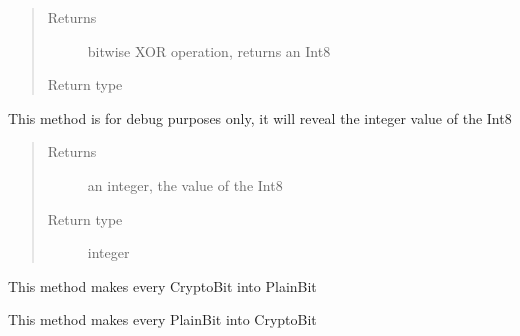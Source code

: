 \documentclass[letterpaper,10pt,english]{sphinxmanual}
\begin{document}
\begin{fulllineitems}
\begin{fulllineitems}
\begin{quote}
\begin{description}
\item[{Returns}] \leavevmode
bitwise XOR operation, returns an Int8

\item[{Return type}] \leavevmode
{\hyperref[datatypes.integers:datatypes.integers.Int8.Int8]{}}

\end{description}\end{quote}

\end{fulllineitems}


\begin{fulllineitems}
\label{datatypes.integers:datatypes.integers.Int8.Int8.debug_showValue}
This method is for debug purposes only, it will reveal the integer value of the Int8
\begin{quote}\begin{description}
\item[{Returns}] \leavevmode
an integer, the value of the Int8

\item[{Return type}] \leavevmode
integer

\end{description}\end{quote}

\end{fulllineitems}


\begin{fulllineitems}
\label{datatypes.integers:datatypes.integers.Int8.Int8.decrypt}
This method makes every CryptoBit into PlainBit

\end{fulllineitems}


\begin{fulllineitems}
\label{datatypes.integers:datatypes.integers.Int8.Int8.encrypt}
This method makes every PlainBit into CryptoBit

\end{fulllineitems}



\end{fulllineitems}
\end{document}
